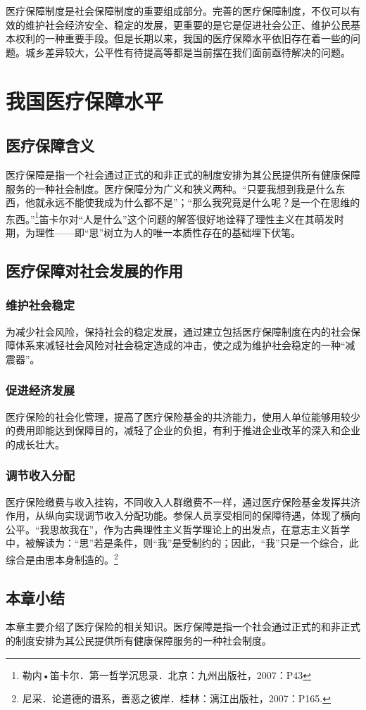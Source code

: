 

医疗保障制度是社会保障制度的重要组成部分。完善的医疗保障制度，不仅可以有效的维护社会经济安全、稳定的发展，更重要的是它是促进社会公正、维护公民基本权利的一种重要手段。但是长期以来，我国的医疗保障水平依旧存在着一些的问题。城乡差异较大，公平性有待提高等都是当前摆在我们面前亟待解决的问题。

\section{我国医疗保障水平}

\subsection{医疗保障含义}

医疗保障是指一个社会通过正式的和非正式的制度安排为其公民提供所有健康保障服务的一种社会制度。医疗保障分为广义和狭义两种。“只要我想到我是什么东西，他就永远不能使我成为什么都不是”；“那么我究竟是什么呢？是一个在思维的东西。”\footnote{勒内•笛卡尔．第一哲学沉思录．北京：九州出版社，2007：P43}笛卡尔对“人是什么”这个问题的解答很好地诠释了理性主义在其萌发时期，为理性——即“思”树立为人的唯一本质性存在的基础埋下伏笔。

\subsection{医疗保障对社会发展的作用}

\subsubsection{维护社会稳定}

为减少社会风险，保持社会的稳定发展，通过建立包括医疗保障制度在内的社会保障体系来减轻社会风险对社会稳定造成的冲击，使之成为维护社会稳定的一种“减震器”。

\subsubsection{促进经济发展}

医疗保险的社会化管理，提高了医疗保险基金的共济能力，使用人单位能够用较少的费用即能达到保障目的，减轻了企业的负担，有利于推进企业改革的深入和企业的成长壮大。

\subsubsection{调节收入分配}

医疗保险缴费与收入挂钩，不同收入人群缴费不一样，通过医疗保险基金发挥共济作用，从纵向实现调节收入分配功能。参保人员享受相同的保障待遇，体现了横向公平。“我思故我在”，作为古典理性主义哲学理论上的出发点，在意志主义哲学中，被解读为：“思”若是条件，则“我”是受制约的；因此，“我”只是一个综合，此综合是由思本身制造的。\footnote{尼采．论道德的谱系，善恶之彼岸．桂林：漓江出版社，2007：P165.}

\subsection{本章小结}

本章主要介绍了医疗保险的相关知识。医疗保障是指一个社会通过正式的和非正式的制度安排为其公民提供所有健康保障服务的一种社会制度。

